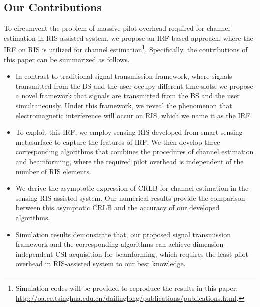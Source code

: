 \documentclass[12pt,draftclsnofoot,journal,onecolumn]{IEEEtran}
\theoremstyle{nonumberplain}
\begin{document}
\subsection{Our Contributions}
\label{Our Contributions}

To circumvent the problem of massive pilot overhead required for channel estimation in RIS-assisted system, we propose an \ac{IRF}-based approach, where the \ac{IRF} on RIS is utilized for channel estimation\footnote{Simulation codes will be provided to reproduce the results in this paper: \url{http://oa.ee.tsinghua.edu.cn/dailinglong/publications/publications.html}.}.
Specifically, the contributions of this paper can be summarized as follows.
    \begin{itemize}
        \item %
        In contrast to traditional signal transmission framework, where signals transmitted from the \ac{BS} and the user occupy different time slots, we propose a novel framework that signals are transmitted from the \ac{BS} and the user simultaneously.
        Under this framework, we reveal the phenomenon that electromagnetic interference will occur on RIS, which we name it as the \ac{IRF}.
        \item
        To exploit this \ac{IRF}, we employ sensing RIS developed from smart sensing metasurface to capture the features of \ac{IRF}.
        We then develop three corresponding algorithms that combines the procedures of channel estimation and beamforming, where the required pilot overhead is independent of the number of RIS elements.
        \item
        We derive the asymptotic expression of \ac{CRLB} for channel estimation in the sensing RIS-assisted system.
        Our numerical results provide the comparison between this asymptotic \ac{CRLB} and the accuracy of our developed algorithms.
        \item
        Simulation results demonstrate that, our proposed signal transmission framework and the corresponding algorithms can achieve dimension-independent CSI acquisition for beamforming, which requires the least pilot overhead in RIS-assisted system to our best knowledge.

\end{itemize}
\end{document}
